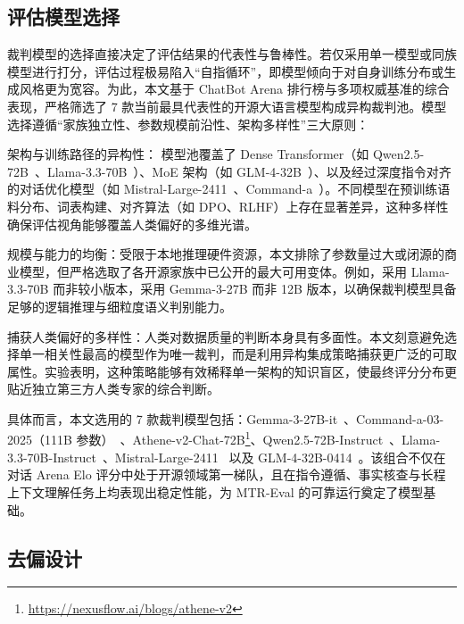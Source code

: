 \subsection{评估模型选择}



裁判模型的选择直接决定了评估结果的代表性与鲁棒性。若仅采用单一模型或同族模型进行打分，评估过程极易陷入“自指循环”，即模型倾向于对自身训练分布或生成风格更为宽容。为此，本文基于 ChatBot Arena 排行榜与多项权威基准的综合表现，严格筛选了 7 款当前最具代表性的开源大语言模型构成异构裁判池。模型选择遵循“家族独立性、参数规模前沿性、架构多样性”三大原则：



架构与训练路径的异构性： 模型池覆盖了 Dense Transformer（如 Qwen2.5-72B~\citep{qwen2025qwen25technicalreport}、Llama-3.3-70B~\citep{grattafiori2024llama3herdmodels}）、MoE 架构（如 GLM-4-32B~\citep{glm2024chatglmfamilylargelanguage}）、以及经过深度指令对齐的对话优化模型（如 Mistral-Large-2411~\citep{jiang2023mistral7b}、Command-a~\citep{cohere2025commandaenterprisereadylarge}）。不同模型在预训练语料分布、词表构建、对齐算法（如 DPO、RLHF）上存在显著差异，这种多样性确保评估视角能够覆盖人类偏好的多维光谱。

规模与能力的均衡：受限于本地推理硬件资源，本文排除了参数量过大或闭源的商业模型，但严格选取了各开源家族中已公开的最大可用变体。例如，采用 Llama-3.3-70B 而非较小版本，采用 Gemma-3-27B 而非 12B 版本，以确保裁判模型具备足够的逻辑推理与细粒度语义判别能力。

捕获人类偏好的多样性：人类对数据质量的判断本身具有多面性。本文刻意避免选择单一相关性最高的模型作为唯一裁判，而是利用异构集成策略捕获更广泛的可取属性。实验表明，这种策略能够有效稀释单一架构的知识盲区，使最终评分分布更贴近独立第三方人类专家的综合判断。



具体而言，本文选用的 7 款裁判模型包括：Gemma-3-27B-it~\citep{gemmateam2025gemma3technicalreport}、Command-a-03-2025（111B 参数）~\citep{cohere2025commandaenterprisereadylarge}、Athene-v2-Chat-72B\footnote{\url{https://nexusflow.ai/blogs/athene-v2}}、Qwen2.5-72B-Instruct~\citep{qwen2025qwen25technicalreport}、Llama-3.3-70B-Instruct~\citep{grattafiori2024llama3herdmodels}、Mistral-Large-2411~\citep{jiang2023mistral7b} 以及 GLM-4-32B-0414~\citep{glm2024chatglmfamilylargelanguage}。该组合不仅在对话 Arena Elo 评分中处于开源领域第一梯队，且在指令遵循、事实核查与长程上下文理解任务上均表现出稳定性能，为 MTR-Eval 的可靠运行奠定了模型基础。



\subsection{去偏设计}



